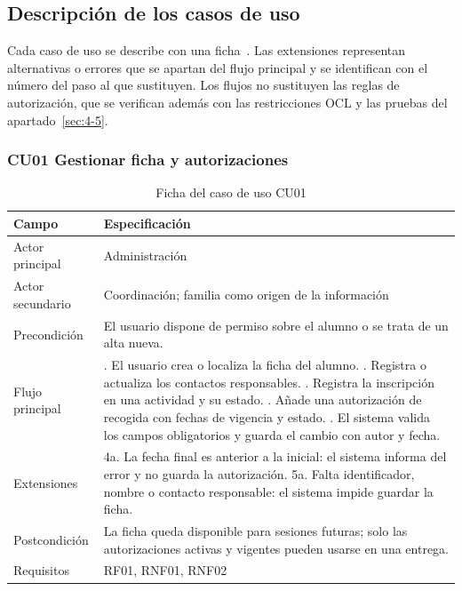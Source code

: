 \subsection{Descripción de los casos de uso}\label{sec:4-1-2}

Cada caso de uso se describe con una ficha~\cite{ref36}. Las extensiones representan alternativas o errores que se apartan del flujo principal y se identifican con el número del paso al que sustituyen. Los flujos no sustituyen las reglas de autorización, que se verifican además con las restricciones OCL y las pruebas del apartado~\ref{sec:4-5}.

\subsubsection{CU01 Gestionar ficha y autorizaciones}\label{sec:4-1-2-1}

\begin{table}[H]
\centering\small
\begin{tabularx}{\textwidth}{>{\hsize=0.381\hsize\raggedright\arraybackslash}X>{\hsize=1.619\hsize\raggedright\arraybackslash}X}
\toprule
\rowcolor{cabeceratabla} \textbf{Campo} & \textbf{Especificación} \\
\midrule
Actor principal & Administración \\
Actor secundario & Coordinación; familia como origen de la información \\
Precondición & El usuario dispone de permiso sobre el alumno o se trata de un alta nueva. \\
Flujo principal & 1. El usuario crea o localiza la ficha del alumno. \newline 2. Registra o actualiza los contactos responsables. \newline 3. Registra la inscripción en una actividad y su estado. \newline 4. Añade una autorización de recogida con fechas de vigencia y estado. \newline 5. El sistema valida los campos obligatorios y guarda el cambio con autor y fecha. \\
Extensiones & 4a. La fecha final es anterior a la inicial: el sistema informa del error y no guarda la autorización. \newline 5a. Falta identificador, nombre o contacto responsable: el sistema impide guardar la ficha. \\
Postcondición & La ficha queda disponible para sesiones futuras; solo las autorizaciones activas y vigentes pueden usarse en una entrega. \\
Requisitos & RF01, RNF01, RNF02 \\
\bottomrule
\end{tabularx}
\caption{Ficha del caso de uso CU01}\label{tab:25}
\end{table}

